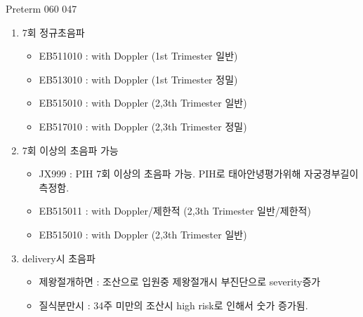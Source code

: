 \begin{commentbox}{Preterm 060 047}
\begin{enumerate}\tightlist
\item 7회 정규초음파
	\begin{itemize}\tightlist
	\item EB511010 : with Doppler (1st Trimester 일반) 
	\item EB513010 : with Doppler (1st Trimester 정밀) 
	\item EB515010 : with Doppler (2,3th Trimester 일반) 
	\item EB517010 : with Doppler (2,3th Trimester 정밀) 
	\end{itemize}
\item 7회 이상의 초음파 가능
	\begin{itemize}\tightlist
	\item JX999 : PIH 7회 이상의 초음파 가능. PIH로 태아안녕평가위해 자궁경부길이 측정함.
	\item EB515011 : with Doppler/제한적 (2,3th Trimester 일반/제한적)
	\item EB515010 : with Doppler (2,3th Trimester 일반)
	\end{itemize}	
\item delivery시 초음파
	\begin{itemize}\tightlist
	\item 제왕절개하면 : 조산으로 입원중 제왕절개시 부진단으로 severity증가
	\item 질식분만시 : 34주 미만의 조산시 high risk로 인해서 숫가 증가됨.
	\end{itemize}
\end{enumerate}
\end{commentbox}

